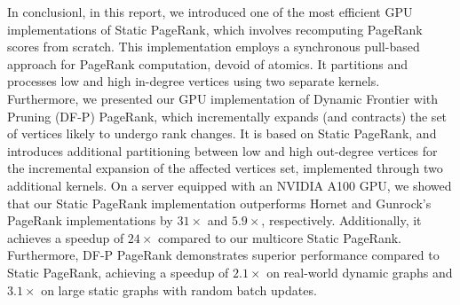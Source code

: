 In conclusionl, in this report, we introduced one of the most efficient GPU implementations of Static PageRank, which involves recomputing PageRank scores from scratch. This implementation employs a synchronous pull-based approach for PageRank computation, devoid of atomics. It partitions and processes low and high in-degree vertices using two separate kernels. Furthermore, we presented our GPU implementation of Dynamic Frontier with Pruning (DF-P) PageRank, which incrementally expands (and contracts) the set of vertices likely to undergo rank changes. It is based on Static PageRank, and introduces additional partitioning between low and high out-degree vertices for the incremental expansion of the affected vertices set, implemented through two additional kernels. On a server equipped with an NVIDIA A100 GPU, we showed that our Static PageRank implementation outperforms Hornet and Gunrock's PageRank implementations by $31\times$ and $5.9\times$, respectively. Additionally, it achieves a speedup of $24\times$ compared to our multicore Static PageRank. Furthermore, DF-P PageRank demonstrates superior performance compared to Static PageRank, achieving a speedup of $2.1\times$ on real-world dynamic graphs and $3.1\times$ on large static graphs with random batch updates.
